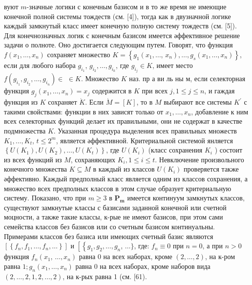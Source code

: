 \documentclass[10pt]{article}
\begin{document}
вуют $m$-значные логики с конечным базисом и в то же время не имеющие конечной полной системы тождеств (см. [4]), тогда как в двузначной логике каждый замкнутый класс имеет конечную полную систему тождеств (см. [5]). Для конечнозначных логик с конечным базисом имеется әффективное решение задачи о полноте. Оно достигается следующим путем. Говорят, что функция $f\left(x_{1}, \ldots, x_{n}\right)$ сохраняет множество $K=\left\{g_{1}\left(x_{1}, \ldots\right.\right.$, $\left.\left.x_{n}\right), \ldots, g_{s}\left(x_{1}, \ldots, x_{n}\right)\right\}$, если для любого набора $g_{i_{1}}$, $g_{i_{2}}, \ldots, g_{i_{k}}$, где $g_{i_{j}} \in K$, имеет место $f\left(g_{i_{1}}, g_{i_{2}}, \ldots, g_{i_{n}}\right) \in$ $\in K$. Множество $K$ наз. пр а ви ль ны м, если селекторная функция $g_{j}\left(x_{1}, \ldots, x_{n}\right)=x_{j}$ содержится в $K$ при всех $j, 1 \leqslant j \leqslant n$, и гаждая функция из $K$ сохраняет $\dot{K}$. Если $\dot{M}=[K]$, то в $M$ выбирают все системы $K^{\prime}$ с такими свойствами: функции в них зависят только от $x_{1}, \ldots, x_{n}$, добавление к ним всех селекторных функций делает их правильными, они не содержат в качестве подмножества $K$. Указанная процедура выделения всех правильных множеств $K_{1}, \ldots, K_{t}$, $t \leqslant 2^{m}$, является әффективной. Критериальной системой янляется $\left\{U\left(K_{1}\right), U\left(K_{2}\right), \ldots, U\left(K_{t}\right)\right\}$, где $U\left(K_{i}\right)$ (класс сохранения $K_{i}$ ) состоит из всех функций из $M$, сохраняющих $K_{i}, 1 \leqslant i \leqslant t$. Невключение произвольного конечного множества $K \subseteq M$ в каждый из классов $U\left(K_{i}\right)$ проверяется также әффективно. Каждый предполный класс является одним из классов сохранения, а множество всех предполных классов в этом случае образует критериальную систему. Показано, что при $m \geqslant 3$ в $\boldsymbol{P}_{\boldsymbol{m}}$ имеется континуум замкнутых классов, существуют замкнутые классы с базисами заданной конечной или счетной моцности, а также такие классы, к-рые не имеют базисов, при этом сами семейства классов без базисов или со счетным базисом континуальны. Примерами классов без базиса или имеющих счетный базис являются $\left[\left\{f_{n}, f_{1}, \ldots, f_{n}, \ldots\right\}\right]$ и $\left[\left\{g_{1}, g_{2}, \ldots, g_{n}\right.\right.$, $\ldots\}$, где: $f_{n} \equiv 0$ при $n=0$, а при $n>0$ функция $f_{n}\left(x_{1}\right.$, $\left.\ldots, x_{n}\right)$ равна 0 на всех наборах, кроме $(2, \ldots, 2)$, на к-ром равна $1 ; g_{n}\left(x_{1}, \ldots, x_{n}\right)$ равна 0 на всех наборах, кроме наборов вида $(2, \ldots, 2,1,2, \ldots, 2)$, на к-рых равна 1 (см. [61).
\end{document}
